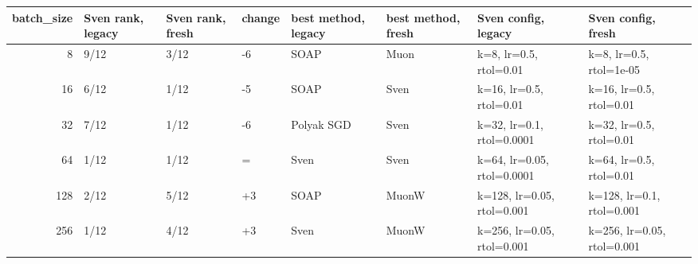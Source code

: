 \begin{tabular}{rlllllll}
\toprule
batch\_size & Sven rank, legacy & Sven rank, fresh & change & best method, legacy & best method, fresh & Sven config, legacy & Sven config, fresh \\
\midrule
8 & 9/12 & 3/12 & -6 & SOAP & Muon & k=8, lr=0.5, rtol=0.01 & k=8, lr=0.5, rtol=1e-05 \\
16 & 6/12 & 1/12 & -5 & SOAP & Sven & k=16, lr=0.5, rtol=0.01 & k=16, lr=0.5, rtol=0.01 \\
32 & 7/12 & 1/12 & -6 & Polyak SGD & Sven & k=32, lr=0.1, rtol=0.0001 & k=32, lr=0.5, rtol=0.01 \\
64 & 1/12 & 1/12 & = & Sven & Sven & k=64, lr=0.05, rtol=0.0001 & k=64, lr=0.5, rtol=0.01 \\
128 & 2/12 & 5/12 & +3 & SOAP & MuonW & k=128, lr=0.05, rtol=0.001 & k=128, lr=0.1, rtol=0.001 \\
256 & 1/12 & 4/12 & +3 & Sven & MuonW & k=256, lr=0.05, rtol=0.001 & k=256, lr=0.05, rtol=0.001 \\
\bottomrule
\end{tabular}
